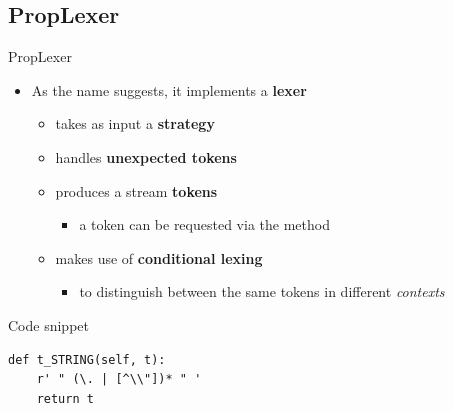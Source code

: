 \subsection{PropLexer}
\begin{frame}[fragile]{PropLexer}
  \begin{itemize}
  \item As the name suggests, it implements a {\bf lexer}
    \begin{itemize}
    \item takes as input a {\bf strategy}
    \item handles {\bf unexpected tokens}
    \item produces a stream {\bf tokens}
      \begin{itemize}
      \item a token can be requested via the  method
      \end{itemize}
      \n
    \item makes use of {\bf conditional lexing}
      \begin{itemize}
      \item to distinguish between the same tokens in different \emph{contexts}
      \end{itemize}
    \end{itemize}
  \end{itemize}
  \begin{exampleblock}{Code snippet}
\begin{verbatim}
def t_STRING(self, t):
    r' " (\. | [^\\"])* " '
    return t
\end{verbatim}
  \end{exampleblock}  
\end{frame}
